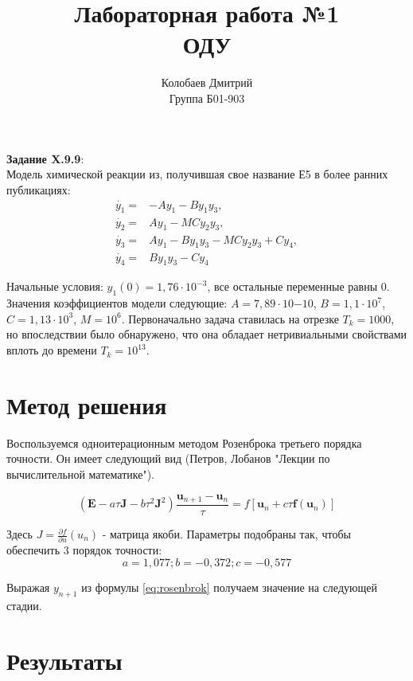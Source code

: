 \documentclass[a4paper,12pt]{article} %
\author{Колобаев Дмитрий\\Группа Б01-903}
\title{Лабораторная работа №1 \\ОДУ} %
\date{}
\begin{document}
\maketitle

\begin{flushleft}
	\textbf{Задание X.9.9}: \\
	Модель химической реакции из, получившая свое название Е5 в более ранних публикациях:
	\begin{align*}
		\dot{y_1} = & -Ay_1 - By_1y_3, \\
		\dot{y_2} = & Ay_1 - MCy_2y_3, \\
		\dot{y_3} = & Ay_1 - By_1y_3 - MCy_2y_3 + Cy_4, \\
		\dot{y_4} = & By_1y_3 - Cy_4
	\end{align*}
\end{flushleft}

Начальные условия: $y_1(0) = 1,76\cdot 10^{-3}$, все остальные переменные равны 0. Значения коэффициентов модели следующие: $A=7,89\cdot 10{-10}$, $B=1,1\cdot 10^{7}$, $C=1,13\cdot 10^{3}$, $M = 10^6$. Первоначально задача ставилась на отрезке $T_k = 1000$, но впоследствии было обнаружено, что она обладает нетривиальными свойствами вплоть до времени $T_k=10^{13}$.

\section*{Метод решения}

Воспользуемся одноитерационным методом Розенброка третьего порядка точности. Он имеет следующий вид (Петров, Лобанов "Лекции по вычислительной математике").

\begin{equation}
	(\textbf{E} -a\tau \textbf{J} - b\tau^2\textbf{J}^2)\frac{\textbf{u}_{n+1} - \textbf{u}_n}{\tau} = f[\textbf{u}_n + c\tau \textbf{f}(\textbf{u}_n)]
	\label{eq:rosenbrok}
\end{equation}

Здесь $J = \frac{\partial f}{\partial u}(u_n)$ - матрица якоби. Параметры подобраны так, чтобы обеспечить 3 порядок точности:
$$a = 1,077; b = -0,372; c = -0,577$$

Выражая $y_{n+1}$ из формулы \ref{eq:rosenbrok} получаем значение на следующей стадии.

\section*{Результаты}
\end{document}
